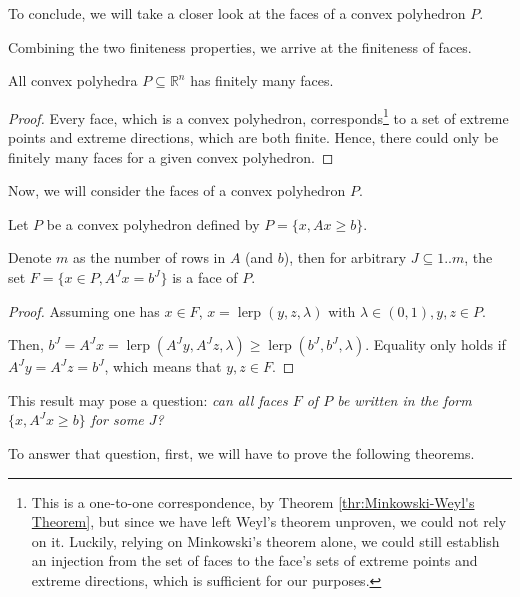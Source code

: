 To conclude, we will take a closer look at the faces of a convex polyhedron \( P
\).

Combining the two finiteness properties, we arrive at the finiteness of faces.

\begin{corollary}
\label{cor:Finiteness of faces in convex polyhedra}
  All convex polyhedra \( P \subseteq \mathbb{R}^{n} \) has finitely many faces.
\end{corollary}

\begin{proof}
Every face, which is a convex polyhedron, corresponds\footnote{This is a
one-to-one correspondence, by Theorem \ref{thr:Minkowski-Weyl's Theorem}, but
since we have left Weyl's theorem unproven, we could not rely on it. Luckily,
relying on Minkowski's theorem alone, we could still establish an injection from
the set of faces to the face's sets of extreme points and extreme directions,
which is sufficient for our purposes.} to
a set of extreme points and extreme directions, which are both finite. Hence,
there could only be finitely many faces for a given convex polyhedron.
\end{proof}


Now, we will consider the faces of a convex polyhedron \( P \).

\begin{theorem}
  Let \( P \) be a convex polyhedron defined by \( P = \{x, Ax \ge  b\}   \).
  
  Denote \( m \) as the number of rows in \( A \) (and \( b \)), then for
  arbitrary \( J \subseteq 1..m \), the set \( F = \{x \in P, A^{J}x = b^{J}\}
  \) is a face of \( P \).
\end{theorem}

\begin{proof}
  Assuming one has \( x \in F \), \( x = \operatorname{lerp}(y, z, \lambda) \)
  with \( \lambda \in (0, 1), y, z \in P \).

  Then, \( b^{J} = A^{J}x = \operatorname{lerp}(A^{J}y, A^{J}z, \lambda) \ge
  \operatorname{lerp}(b^{J}, b^{J}, \lambda) \). Equality only holds if \(
  A^{J}y = A^{J}z = b^{J} \), which means that \( y, z \in F \).
\end{proof}

This result may pose a question: \textit{can all faces \( F \) of \( P \) be
written in the form \( \{x, A^{J}x \ge  b\}  \) for some \( J \)?}

To answer that question, first, we will have to prove the following theorems.

